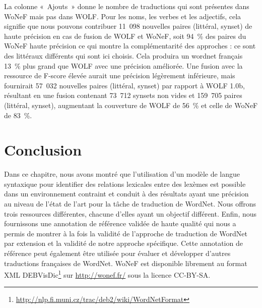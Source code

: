 La colonne «~Ajouts~» donne le nombre de traductions qui sont présentes dans
WoNeF mais pas dans WOLF. Pour les noms, les verbes et les adjectifs, cela
signifie que nous pouvons contribuer 11~098 nouvelles paires (littéral, synset)
de haute précision en cas de fusion de WOLF et WoNeF, soit 94~\% des paires du
WoNeF haute précision ce qui montre la complémentarité des approches : ce sont
des littéraux différents qui sont ici choisis. Cela produira un wordnet
français 13~\% plus grand que WOLF avec une précision améliorée. Une fusion
avec la ressource de F-score élevée aurait une précision légèrement inférieure,
mais fournirait 57~032 nouvelles paires (littéral, synset) par rapport à WOLF
1.0b, résultant en une fusion contenant 73~712 synsets non vides et 159~705
paires (littéral, synset), augmentant la couverture de WOLF de 56~\% et celle
de WoNeF de 83~\%.


\section*{Conclusion}

Dans ce chapitre, nous avons montré que l'utilisation d'un modèle de langue
syntaxique pour identifier des relations lexicales entre des lexèmes est
possible dans un environnement contraint et conduit à des résultats ayant une
précision au niveau de l'état de l'art pour la tâche de traduction de WordNet.
Nous offrons trois ressources différentes, chacune d'elles ayant un objectif
différent. Enfin, nous fournissons une annotation de référence validée de haute
qualité qui nous a permis de montrer à la fois la validité de l'approche de
traduction de WordNet par extension et la validité de notre approche
spécifique. Cette annotation de référence peut également être utilisée pour
évaluer et développer d'autres traductions françaises de WordNet. WoNeF est
disponible librement au format XML
DEBVisDic\footnote{\url{http://nlp.fi.muni.cz/trac/deb2/wiki/WordNetFormat}}
sur \url{http://wonef.fr/} sous la licence CC-BY-SA.

